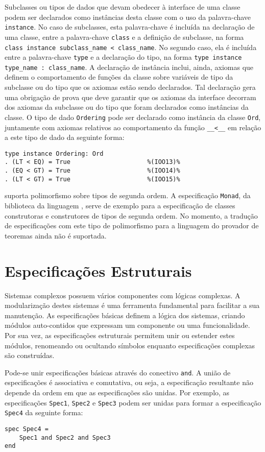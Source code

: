 Subclasses ou tipos de dados que devam obedecer à interface de uma classe podem ser declarados como instâncias desta classe com o uso da palavra-chave \Verb.instance..
No caso de subclasses, esta palavra-chave é incluída na declaração de uma classe, entre a palavra-chave \Verb.class. e a definição de subclasse, na forma \Verb.class instance subclass_name < class_name..
No segundo caso, ela é incluída entre a palavra-chave \Verb.type. e a declaração do tipo, na forma \Verb.type instance type_name : class_name..
A declaração de instância inclui, ainda, axiomas que definem o comportamento de funções da classe sobre variáveis de tipo da subclasse ou do tipo que os axiomas estão sendo declarados.
Tal declaração gera uma obrigação de prova que deve garantir que os axiomas da interface decorram dos axiomas da subclasse ou do tipo que foram declarados como instâncias da classe.
O tipo de dado \Verb.Ordering. pode ser declarado como instância da classe \Verb.Ord., juntamente com axiomas relativos ao comportamento da função \Verb.__<__. em relação a este tipo de dado da seguinte forma:
\begin{Verbatim}
type instance Ordering: Ord
. (LT < EQ) = True                     %(IOO13)%
. (EQ < GT) = True                     %(IOO14)%
. (LT < GT) = True                     %(IOO15)%
\end{Verbatim}

\HasCASL suporta polimorfismo sobre tipos de segunda ordem.
A especificação \Verb.Monad., da biblioteca da linguagem \CASL, serve de exemplo para a especificação de classes construtoras e construtores de tipos de segunda ordem.
No momento, a tradução de especificações com este tipo de polimorfismo para a linguagem do provador de teoremas ainda não é suportada.

\section{Especificações Estruturais}
Sistemas complexos possuem vários componentes com lógicas complexas.
A modularização destes sistemas é uma ferramenta fundamental para facilitar a sua manutenção.
As especificações básicas definem a lógica dos sistemas, criando módulos auto-contidos que expressam um componente ou uma funcionalidade.
Por sua vez, as especificações estruturais permitem unir ou estender estes módulos, renomeando ou ocultando símbolos enquanto especificações complexas são construídas.

Pode-se unir especificações básicas através do conectivo \Verb.and..
A união de especificações é associativa e comutativa, ou seja, a especificação resultante não depende da ordem em que as especificações são unidas.
Por exemplo, as especificações \Verb.Spec1., \Verb.Spec2. e \Verb.Spec3. podem ser unidas para formar a especificação \Verb.Spec4. da seguinte forma:
\begin{Verbatim}
spec Spec4 =
    Spec1 and Spec2 and Spec3
end
\end{Verbatim}


